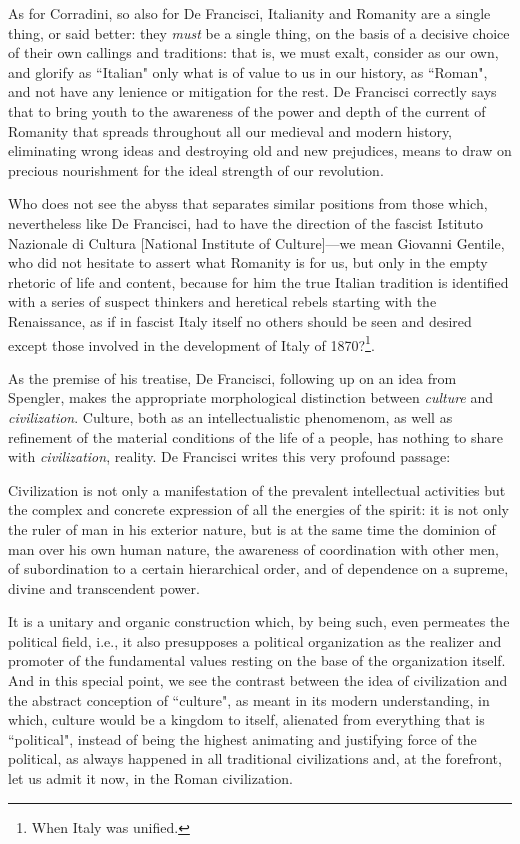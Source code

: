 As for Corradini, so also for De Francisci, Italianity and Romanity are a single thing, or said better: they \emph{must} be a single thing, on the basis of a decisive choice of their own callings and traditions: that is, we must exalt, consider as our own, and glorify as ``Italian" only what is of value to us in our history, as ``Roman", and not have any lenience or mitigation for the rest. De Francisci correctly says that to bring youth to the awareness of the power and depth of the current of Romanity that spreads throughout all our medieval and modern history, eliminating wrong ideas and destroying old and new prejudices, means to draw on precious nourishment for the ideal strength of our revolution.

Who does not see the abyss that separates similar positions from those which, nevertheless like De Francisci, had to have the direction of the fascist Istituto Nazionale di Cultura [National Institute of Culture]—we mean Giovanni Gentile, who did not hesitate to assert what Romanity is for us, but only in the empty rhetoric of life and content, because for him the true Italian tradition is identified with a series of suspect thinkers and heretical rebels starting with the Renaissance, as if in fascist Italy itself no others should be seen and desired except those involved in the development of Italy of 1870?\footnote{When Italy was unified.}.

As the premise of his treatise, De Francisci, following up on an idea from Spengler, makes the appropriate morphological distinction between \emph{culture} and \emph{civilization}. Culture, both as an intellectualistic phenomenom, as well as refinement of the material conditions of the life of a people, has nothing to share with \emph{civilization}, reality. De Francisci writes this very profound passage:

\begin{quotex}
Civilization is not only a manifestation of the prevalent intellectual activities but the complex and concrete expression of all the energies of the spirit: it is not only the ruler of man in his exterior nature, but is at the same time the dominion of man over his own human nature, the awareness of coordination with other men, of subordination to a certain hierarchical order, and of dependence on a supreme, divine and transcendent power. 

\end{quotex}
It is a unitary and organic construction which, by being such, even permeates the political field, i.e., it also presupposes a political organization as the realizer and promoter of the fundamental values resting on the base of the organization itself. And in this special point, we see the contrast between the idea of civilization and the abstract conception of ``culture", as meant in its modern understanding, in which, culture would be a kingdom to itself, alienated from everything that is ``political", instead of being the highest animating and justifying force of the political, as always happened in all traditional civilizations and, at the forefront, let us admit it now, in the Roman civilization.

